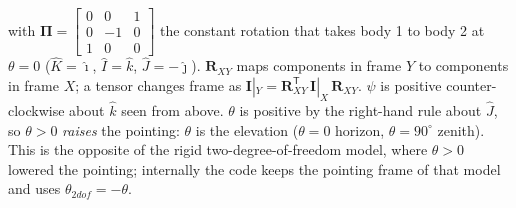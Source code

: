 \documentclass[10pt,a4paper]{article}
\numberwithin{equation}{section}
\begin{document}
with $\boldsymbol\Pi = \left[\begin{smallmatrix}0&0&1\\0&-1&0\\1&0&0\end{smallmatrix}\right]$ the constant rotation that takes body 1 to body 2 at $\theta = 0$ ($\hat K = \hat\imath$, $\hat I = \hat k$, $\hat J = -\hat\jmath$). $\mathbf R_{XY}$ maps components in frame $Y$ to components in frame $X$; a tensor changes frame as $\mathbf I|_Y = \mathbf R_{XY}^{\mathsf T}\,\mathbf I|_X\,\mathbf R_{XY}$. $\psi$ is positive counter-clockwise about $\hat k$ seen from above. $\theta$ is positive by the right-hand rule about $\hat J$, so $\theta>0$ \emph{raises} the pointing: $\theta$ is the elevation ($\theta = 0$ horizon, $\theta = 90^\circ$ zenith). This is the opposite of the rigid two-degree-of-freedom model, where $\theta>0$ lowered the pointing; internally the code keeps the pointing frame of that model and uses $\theta_{2dof} = -\theta$.
\end{document}
